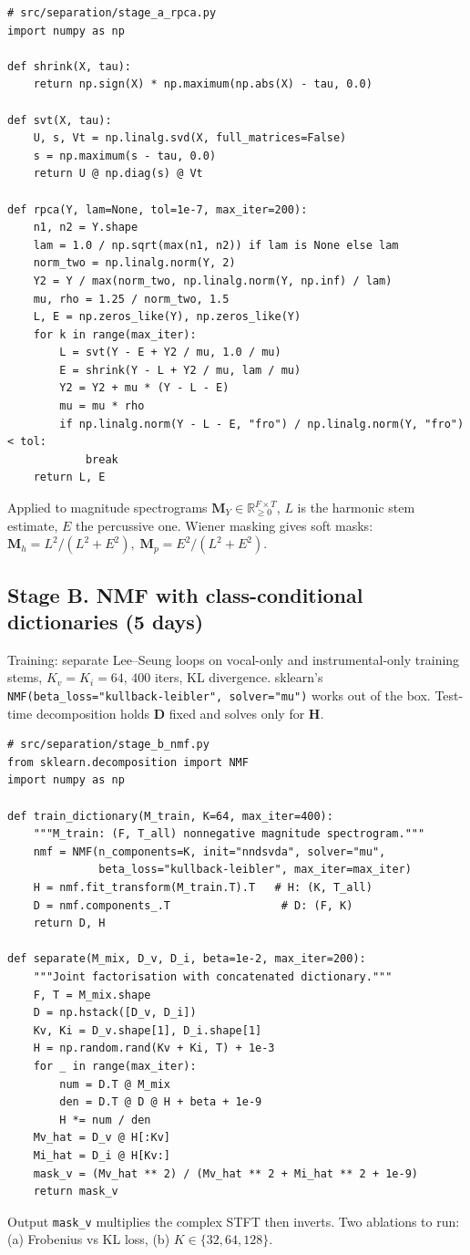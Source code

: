 \documentclass[10pt]{article}
\newcommand{\R}{\mathbb{R}}
\newcommand{\Mb}{\bm{M}}
\begin{document}
\begin{lstlisting}
# src/separation/stage_a_rpca.py
import numpy as np

def shrink(X, tau):
    return np.sign(X) * np.maximum(np.abs(X) - tau, 0.0)

def svt(X, tau):
    U, s, Vt = np.linalg.svd(X, full_matrices=False)
    s = np.maximum(s - tau, 0.0)
    return U @ np.diag(s) @ Vt

def rpca(Y, lam=None, tol=1e-7, max_iter=200):
    n1, n2 = Y.shape
    lam = 1.0 / np.sqrt(max(n1, n2)) if lam is None else lam
    norm_two = np.linalg.norm(Y, 2)
    Y2 = Y / max(norm_two, np.linalg.norm(Y, np.inf) / lam)
    mu, rho = 1.25 / norm_two, 1.5
    L, E = np.zeros_like(Y), np.zeros_like(Y)
    for k in range(max_iter):
        L = svt(Y - E + Y2 / mu, 1.0 / mu)
        E = shrink(Y - L + Y2 / mu, lam / mu)
        Y2 = Y2 + mu * (Y - L - E)
        mu = mu * rho
        if np.linalg.norm(Y - L - E, "fro") / np.linalg.norm(Y, "fro") < tol:
            break
    return L, E
\end{lstlisting}
Applied to magnitude spectrograms $\Mb_Y\!\in\!\R_{\ge 0}^{F\times T}$,
$L$ is the harmonic stem estimate, $E$ the percussive one.  Wiener
masking gives soft masks:
$\Mb_h = L^2 / (L^2 + E^2),\;\Mb_p = E^2 / (L^2 + E^2)$.

\subsection{Stage B. NMF with class-conditional dictionaries (5 days)}
Training: separate Lee--Seung loops on vocal-only and instrumental-only
training stems, $K_v\!=\!K_i\!=\!64$, $400$ iters, KL divergence.
sklearn's \texttt{NMF(beta\_loss="kullback-leibler", solver="mu")} works
out of the box.  Test-time decomposition holds $\bm{D}$ fixed and solves
only for $\bm{H}$.

\begin{lstlisting}
# src/separation/stage_b_nmf.py
from sklearn.decomposition import NMF
import numpy as np

def train_dictionary(M_train, K=64, max_iter=400):
    """M_train: (F, T_all) nonnegative magnitude spectrogram."""
    nmf = NMF(n_components=K, init="nndsvda", solver="mu",
              beta_loss="kullback-leibler", max_iter=max_iter)
    H = nmf.fit_transform(M_train.T).T   # H: (K, T_all)
    D = nmf.components_.T                 # D: (F, K)
    return D, H

def separate(M_mix, D_v, D_i, beta=1e-2, max_iter=200):
    """Joint factorisation with concatenated dictionary."""
    F, T = M_mix.shape
    D = np.hstack([D_v, D_i])
    Kv, Ki = D_v.shape[1], D_i.shape[1]
    H = np.random.rand(Kv + Ki, T) + 1e-3
    for _ in range(max_iter):
        num = D.T @ M_mix
        den = D.T @ D @ H + beta + 1e-9
        H *= num / den
    Mv_hat = D_v @ H[:Kv]
    Mi_hat = D_i @ H[Kv:]
    mask_v = (Mv_hat ** 2) / (Mv_hat ** 2 + Mi_hat ** 2 + 1e-9)
    return mask_v
\end{lstlisting}
Output \texttt{mask\_v} multiplies the complex STFT then inverts.
Two ablations to run: (a) Frobenius vs KL loss, (b) $K\in\{32,64,128\}$.
\end{document}
